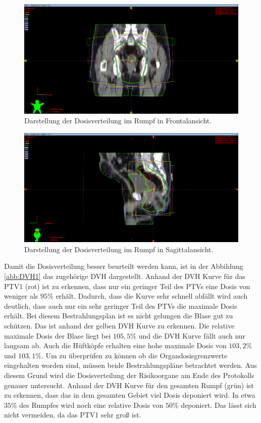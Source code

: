 \begin{figure}[H]
  \centering
  \includegraphics[width=\textwidth]{Bilder/Rektum1_Y.png}
  \caption{Darstellung der Dosisverteilung im Rumpf in Frontalansicht.}
  \label{abb:Y1}
\end{figure}

\begin{figure}[H]
  \centering
  \includegraphics[width=\textwidth]{Bilder/Rektum1_X.png}
  \caption{Darstellung der Dosisverteilung im Rumpf in Sagittalansicht.}
  \label{abb:X1}
\end{figure}

Damit die Dosisverteilung besser beurteilt werden kann, ist in der Abbildung \ref{abb:DVH1} das zugehörige DVH
dargestellt. Anhand der DVH Kurve für das PTV1 (rot) ist zu erkennen, dass nur ein geringer Teil des PTVs eine Dosis von weniger als
$95\%$ erhält. Dadurch, dass die Kurve sehr schnell abfällt wird auch deutlich, dass auch nur ein sehr geringer Teil des PTVs die maximale Dosis erhält.
Bei diesem Bestrahlungsplan ist es nicht gelungen die Blase gut zu schützen. Das ist anhand der gelben DVH Kurve zu erkennen. Die relative maximale Dosis
der Blase liegt bei $105,5\%$ und die DVH Kurve fällt auch nur langsam ab. Auch die Hüftköpfe erhalten eine hohe maximale Dosis von $103,2\%$ und $103,1\%$.
Um zu überprüfen zu können ob die Organdosisgrenzwerte eingehalten worden sind, müssen beide Bestrahlungspläne betrachtet werden. Aus diesem
Grund wird die Dosisverteilung der Risikoorgane am Ende des Protokolls genauer untersucht.
Anhand der DVH Kurve für den gesamten Rumpf (grün) ist zu erkennen, dass das in dem gesamten Gebiet viel Dosis deponiert wird. In etwa $35\%$ des
Rumpfes wird noch eine relative Dosis von $50\%$ deponiert. Das lässt sich nicht vermeiden, da das PTV1 sehr groß ist.

